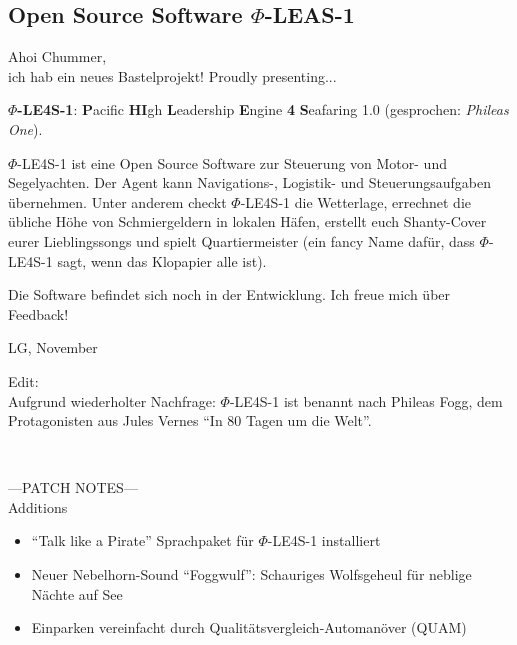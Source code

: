 \documentclass[final]{multiversum}
\begin{document}
\makemultititle
%

\subsection{Open Source Software $\Phi$-LEAS-1}
Ahoi Chummer,\\
ich hab ein neues Bastelprojekt! Proudly presenting...

\textbf{$\Phi$-LE4S-1}: \textbf{P}acific \textbf{HI}gh \textbf{L}eadership
\textbf{E}ngine \textbf{4} \textbf{S}eafaring 1.0 (gesprochen: \textit{Phileas
One}).

$\Phi$-LE4S-1 ist eine Open Source Software zur Steuerung von Motor- und
Segelyachten. Der Agent kann Navigations-, Logistik- und Steuerungsaufgaben
übernehmen. Unter anderem checkt $\Phi$-LE4S-1 die Wetterlage, errechnet die
übliche Höhe von Schmiergeldern in lokalen Häfen,  erstellt euch Shanty-Cover
eurer Lieblingssongs und spielt Quartiermeister (ein fancy Name dafür, dass
$\Phi$-LE4S-1 sagt, wenn das Klopapier alle ist).

Die Software befindet sich noch in der Entwicklung. Ich freue mich über Feedback!

LG, November

\bigskip

Edit:\\
Aufgrund wiederholter Nachfrage: $\Phi$-LE4S-1 ist benannt nach Phileas Fogg,
dem Protagonisten aus Jules Vernes \enquote{In 80 Tagen um die Welt}.

\\

\bigskip

---PATCH NOTES---\\
Additions
\begin{itemize}
    \item \enquote{Talk like a Pirate} Sprachpaket für $\Phi$-LE4S-1 installiert
    \item Neuer Nebelhorn-Sound \enquote{Foggwulf}: Schauriges Wolfsgeheul für neblige
    Nächte auf See
    \item Einparken vereinfacht durch Qualitätsvergleich-Automanöver (QUAM)
\end{itemize}

\bigskip
\end{document}
